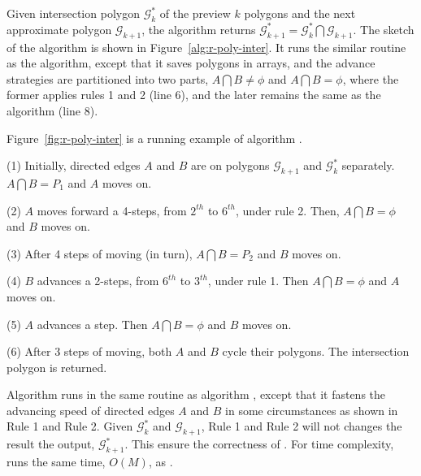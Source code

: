 Given intersection polygon $\mathcal{G}^*_k$ of the preview $k$ polygons and the next approximate polygon $\mathcal{G}_{k+1}$, the algorithm returns $\mathcal{G}^*_{k+1} = \mathcal{G}^*_k  \bigcap \mathcal{G}_{k+1}$.
The sketch of the algorithm is shown in Figure~\ref{alg:r-poly-inter}.
%
It runs the similar routine as the \cpia algorithm, except that it saves polygons in arrays, and the advance strategies are partitioned into two parts, \ie $A \bigcap B \ne \phi$ and $A \bigcap B = \phi$, where the former applies rules 1 and 2 (line 6), and the later remains the same as the \cpia algorithm (line 8).








\begin{example}
Figure~\ref{fig:r-poly-inter} is a running example of algorithm \rpia.

\ni (1) Initially, directed edges $A$ and $B$ are on polygons $\mathcal{G}_{k+1}$ and $\mathcal{G}^*_{k}$ separately. $A \bigcap B = P_1$ and $A$ moves on.

\ni (2) $A$ moves forward a 4-steps, from $2^{th}$ to $6^{th}$, under rule 2. Then, $A \bigcap B = \phi$ and $B$ moves on.

\ni (3) After 4 steps of moving (in turn), $A \bigcap B = P_2$ and $B$ moves on.

\ni (4) $B$ advances a 2-steps, from $6^{th}$ to $3^{th}$, under rule 1. Then $A \bigcap B = \phi$ and $A$ moves on.

\ni (5) $A$ advances a step. Then $A \bigcap B = \phi$ and $B$ moves on.

\ni (6) After 3 steps of moving, both $A$ and $B$ cycle their polygons. The intersection polygon is returned.
\end{example}



Algorithm \rpia runs in the same routine as algorithm \cpia, except that it fastens the advancing speed of directed edges $A$ and $B$ in some circumstances as shown in Rule 1 and Rule 2. Given $\mathcal{G}^*_k$ and $\mathcal{G}_{k+1}$,  Rule 1 and Rule 2 will not changes the result the output, \ie $\mathcal{G}^*_{k+1}$. This ensure the correctness of \rpia.
For time complexity, \rpia runs the same time, $O(M)$, as \cpia.


